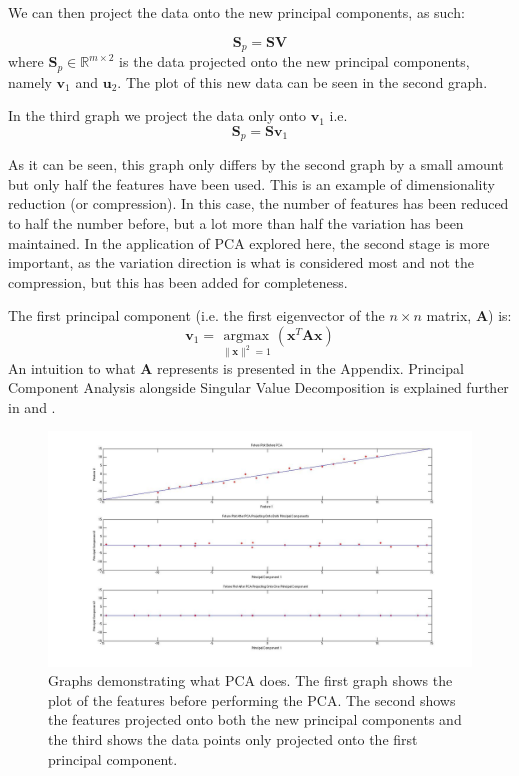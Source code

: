 \documentclass[11pt,a4paper]{article}
\begin{document}
We can then project the data onto the new principal components, as such:

\begin{equation*}
\mathbf{S}_p = \mathbf{S}\mathbf{V}
\end{equation*}
where $\mathbf{S}_p \in \mathbb{R}^{m \times 2}$ is the data projected onto the new principal components, namely $\mathbf{v}_1$ and $\mathbf{u}_2$. The plot of this new data can be seen in the second graph. 

In the third graph we project the data only onto $\mathbf{v}_1$ i.e.
\begin{equation*}
\mathbf{S}_p = \mathbf{S}\mathbf{v}_1
\end{equation*}

As it can be seen, this graph only differs by the second graph by a small amount but only half the features have been used. This is an example of dimensionality reduction (or compression). In this case, the number of features has been reduced to half the number before, but a lot more than half the variation has been maintained. In the application of PCA explored here, the second stage is more important, as the variation direction is what is considered most and not the compression, but this has been added for completeness.

The first principal component (i.e. the first eigenvector of the $n\times n$ matrix, $\mathbf{A}$) is:
\begin{equation}
\mathbf{v}_1 = \underset{\|\mathbf{x}\|^2 = 1}{\operatorname{argmax}}\left( \mathbf{x}^T\mathbf{A}\mathbf{x}\right)
\end{equation}
An intuition to what $\mathbf{A}$ represents is presented in the Appendix. Principal Component Analysis alongside Singular Value Decomposition is explained further in \cite{datascience} and \cite{bishop}. 

\begin{figure}[H]
\centering
\includegraphics[scale=0.35]{PCA_EXPLAINED.jpg}
\caption{Graphs demonstrating what PCA does. The first graph shows the plot of the features before performing the PCA. The second shows the features projected onto both the new principal components and the third shows the data points only projected onto the first principal component.}
\label{pca}
\end{figure}
\end{document}
